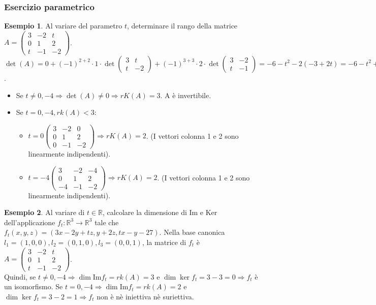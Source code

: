\documentclass[a4paper]{article}
\theoremstyle{definition}
\newtheorem*{es}{Esempio}
\begin{document}
\subsubsection{Esercizio parametrico}
\begin{es}
	Al variare del parametro $t$, determinare il rango della matrice $A = \begin{pmatrix}
			3 & -2 & t  \\
			0 & 1  & 2  \\
			t & -1 & -2
		\end{pmatrix}$.
	$\det(A) = 0 + (-1)^{2 + 2} \cdot 1 \cdot \det \begin{pmatrix}
			3 & t  \\
			t & -2
		\end{pmatrix} + (-1)^{3 + 3} \cdot 2 \cdot \det \begin{pmatrix}
			3 & -2 \\
			t & -1
		\end{pmatrix} = -6 - t^2 - 2(-3 + 2t) = -6 - t^2 + 6 - 4t = -t^2 - 4t = -t(t + 4)$.
	\begin{itemize}
		\item Se $t \ne 0, -4 \Rightarrow \det(A) \ne 0 \Rightarrow rK(A) = 3$. A è invertibile.
		\item Se $t = 0, -4, rk(A) < 3$:
		      \begin{itemize}
			      \item $t = 0 \begin{pmatrix}
					            3 & -2 & 0  \\
					            0 & 1  & 2  \\
					            0 & -1 & -2
				            \end{pmatrix} \Rightarrow rK(A) = 2$. (I vettori colonna 1 e 2 sono linearmente indipendenti).
			      \item $t = -4 \begin{pmatrix}
					            3  & -2 & -4 \\
					            0  & 1  & 2  \\
					            -4 & -1 & -2
				            \end{pmatrix} \Rightarrow rK(A) = 2$. (I vettori colonna 1 e 2 sono linearmente indipendenti).
		      \end{itemize}
	\end{itemize}
\end{es}
\begin{es}
	Al variare di $t \in \mathbb{R}$, calcolare la dimensione di Im e Ker dell'applicazione $f_t: \mathbb{R}^3 \rightarrow \mathbb{R}^3$ tale che $f_t(x, y, z) = (3x-2y+tz, y+2z, tx-y-27)$.
	Nella base canonica $l_1 = (1, 0, 0), l_2 = (0, 1, 0), l_3 = (0, 0, 1)$, la matrice di $f_t$ è $A = \begin{pmatrix}
			3 & -2 & t  \\
			0 & 1  & 2  \\
			t & -1 & -2
		\end{pmatrix}$. \\
	Quindi, se $t \ne 0, -4 \Rightarrow \dim \text{Im} f_t = rk(A) = 3$ e $\dim \ker f_t = 3 - 3 = 0 \Rightarrow f_t$ è un isomorfismo.
	Se $t = 0, -4 \Rightarrow \dim \text{Im} f_t = rk(A) = 2$ e $\dim \ker f_t = 3 - 2 = 1 \Rightarrow f_t$ non è nè iniettiva nè suriettiva.
\end{es}
\end{document}

